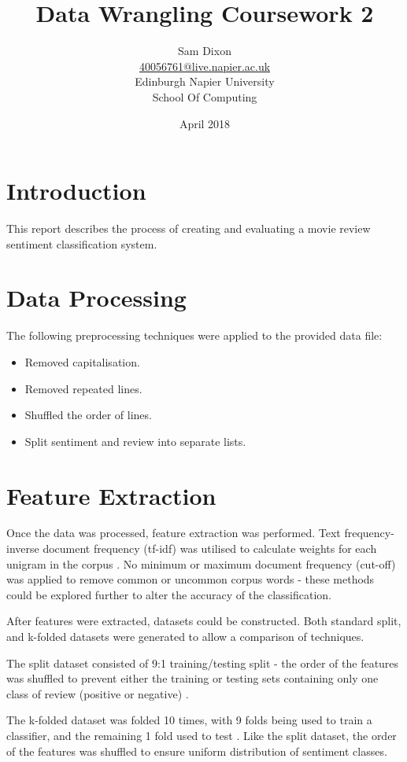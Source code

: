\documentclass[twocolumn]{article}
\title{Data Wrangling Coursework 2}
\author{Sam Dixon
    \\\href{mailto:40056761@live.napier.ac.uk}{40056761@live.napier.ac.uk}
    \\Edinburgh Napier University
    \\School Of Computing
    \\}
\date{April 2018}
\begin{document}
\maketitle


\section{Introduction}
This report describes the process of creating and evaluating a movie review
sentiment classification system.


\section{Data Processing}
The following preprocessing techniques were applied to the provided data file:
\begin{itemize}
    \item Removed capitalisation.
    \item Removed repeated lines.
    \item Shuffled the order of lines.
    \item Split sentiment and review into separate lists.
\end{itemize}


\section{Feature Extraction}
Once the data was processed, feature extraction was performed.
Text frequency-inverse document frequency (tf-idf) was utilised to calculate
weights for each unigram in the corpus \cite{tfidf}.
No minimum or maximum document frequency (cut-off) was applied to remove
common or uncommon corpus words - these methods could be explored further to
alter the accuracy of the classification.

After features were extracted, datasets could be constructed.
Both standard split, and k-folded datasets were generated to allow a
comparison of techniques.

The split dataset consisted of 9:1 training/testing split - the order of the
features was shuffled to prevent either the training or testing sets containing
only one class of review (positive or negative) \cite{split}.

The k-folded dataset was folded 10 times, with 9 folds being used to train a
classifier, and the remaining 1 fold used to test \cite{fold}.
Like the split dataset, the order of the features was shuffled to ensure
uniform distribution of sentiment classes.
\end{document}
